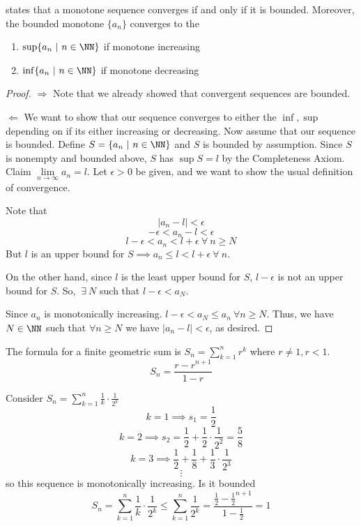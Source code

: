 \documentclass[12pt]{scrartcl}
\begin{document}
\begin{theorem}
   states that a monotone sequence converges if and only if 
  it is bounded. Moreover, the bounded monotone $\{a_n\}$ converges to the 
  \begin{enumerate}
    \item $\sup\{a_n \ | \ n \in \NN\}$ if monotone increasing
    \item $\inf\{a_n \ | \ n \in \NN\}$ if monotone decreasing
  \end{enumerate}

  \begin{proof}
    
    \hfill

    $\Longrightarrow$ Note that we already showed that convergent sequences are bounded. 

    \hfill

    $\Longleftarrow$ We want to show that our sequence 
    converges to either the $\inf, \sup$ depending on if its either increasing or decreasing.
    Now assume that our sequence is bounded. Define $S = \{a_n \ | \ n \in \NN\}$ and $S$ is bounded
    by assumption. Since $S$ is nonempty and bounded above, $S$ has $\sup S = l$ by the Completeness Axiom.
    Claim $\underset{n\to\infty}{\lim}a_n = l$. Let $\epsilon > 0$ be given, and we want to show the usual definition 
    of convergence. 

    Note that 
    \[|a_n - l| < \epsilon\]
    \[-\epsilon < a_n - l  < \epsilon\]
    \[l - \epsilon< a_n < l + \epsilon \ \forall \ n \geq N\]
    But $l$ is an upper bound for $S \implies a_n \leq l < l + \epsilon \ \forall \ n$. 
    
    On the other hand, since $l$ is the least upper bound for $S$, $l - \epsilon$ is not an upper bound for $S$. 
    So, $\ \exists \ N$ such that $l - \epsilon < a_N$. 

    Since $a_n$ is monotonically increasing. $l - \epsilon < a_N \leq a_n \ \forall n \geq N$. Thus, we have 
    $N \in \NN$ such that $\forall n \geq N$ we have $|a_n - l| < \epsilon$, as desired.
  \end{proof}
\end{theorem}

\begin{remark}
  The formula for a finite geometric sum is
  $S_n = \sum_{k=1}^n r^k$ where $r \neq 1, r < 1$.
  \[S_n = \frac{r - r^{n+1}}{1 - r}\] 

  \begin{example}
    Consider $S_n = \sum_{k=1}^n \frac{1}{k} \cdot \frac{1}{2^k}$
    \[k = 1 \implies s_1 = \frac{1}{2}\] 
    \[k = 2 \implies s_2 = \frac{1}{2} + \frac{1}{2} \cdot \frac{1}{2^2} = \frac{5}{8}\]
    \[k = 3 \implies \frac{1}{2} + \frac{1}{8} + \frac{1}{3} \cdot \frac{1}{2^3}\]
    \[\vdots\]
    so this sequence is monotonically increasing. Is it bounded 
    \[S_n = \sum_{k=1}^{n}\frac{1}{k} \cdot \frac{1}{2^k} \leq \sum_{k=1}^n \frac{1}{2^k} = \frac{\frac{1}{2} - \frac{1}{2}^{n+1}}{1 - \frac{1}{2}} = 1\]
  \end{example}
\end{remark}
\end{document}
